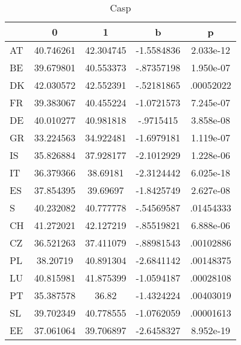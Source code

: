 \begin{table}[htbp]
\caption{\label{clabel} Casp}\centering\medskip
\begin{tabular}{|l|c|c|c|c|}\hline  
 & 0  & 1  & b  & p  \\ \hline  
AT & 40.746261 & 42.304745 & -1.5584836 & 2.033e-12 \\ \hline 
BE & 39.679801 & 40.553373 & -.87357198 & 1.950e-07 \\ \hline 
DK & 42.030572 & 42.552391 & -.52181865 & .00052022 \\ \hline 
FR & 39.383067 & 40.455224 & -1.0721573 & 7.245e-07 \\ \hline 
DE & 40.010277 & 40.981818 & -.9715415 & 3.858e-08 \\ \hline 
GR & 33.224563 & 34.922481 & -1.6979181 & 1.119e-07 \\ \hline 
IS & 35.826884 & 37.928177 & -2.1012929 & 1.228e-06 \\ \hline 
IT & 36.379366 & 38.69181 & -2.3124442 & 6.025e-18 \\ \hline 
ES & 37.854395 & 39.69697 & -1.8425749 & 2.627e-08 \\ \hline 
S & 40.232082 & 40.777778 & -.54569587 & .01454333 \\ \hline 
CH & 41.272021 & 42.127219 & -.85519821 & 6.888e-06 \\ \hline 
CZ & 36.521263 & 37.411079 & -.88981543 & .00102886 \\ \hline 
PL & 38.20719 & 40.891304 & -2.6841142 & .00148375 \\ \hline 
LU & 40.815981 & 41.875399 & -1.0594187 & .00028108 \\ \hline 
PT & 35.387578 & 36.82 & -1.4324224 & .00403019 \\ \hline 
SL & 39.702349 & 40.778555 & -1.0762059 & .00001613 \\ \hline 
EE & 37.061064 & 39.706897 & -2.6458327 & 8.952e-19 \\ \hline 
  \end{tabular}
\end{table}
